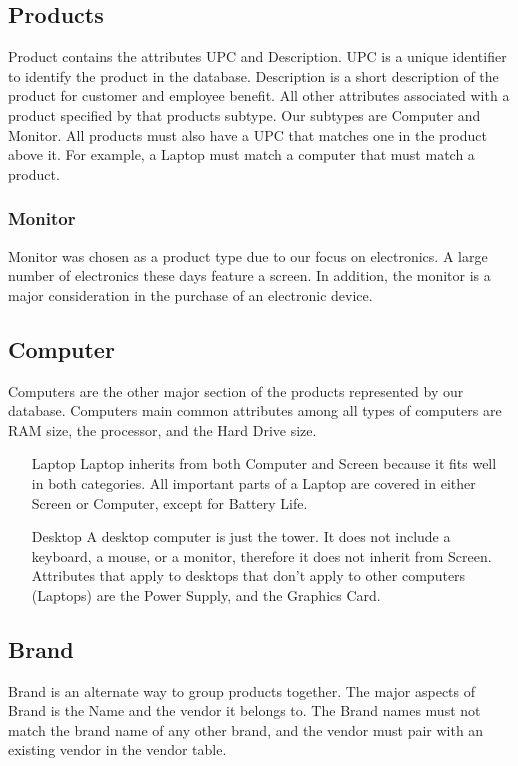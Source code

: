 \documentclass{article}
\begin{document}
		\subsection{Products}
			Product contains the attributes UPC and Description. UPC is a unique
			identifier to identify the product in the database. Description is a short
			description of the product for customer and employee benefit. All other
			attributes associated with a product specified by that products subtype.
			Our subtypes are Computer and Monitor. All products must also have a UPC that 
			matches one in the product above it. For example, a Laptop must match a 
			computer that must match a product.

			\subsubsection{Monitor}
				Monitor was chosen as a product type due to our focus on electronics.  A
				large number of electronics these days feature a screen. In addition, the
				monitor is a major consideration in the purchase of an electronic device.

			\subsection{Computer}
				Computers are the other major section of the products represented by our
				database. Computers main common attributes among all types of computers
				are RAM size, the processor, and the Hard Drive size. 
				\begin{itemize}
				
					\item [Laptop] Laptop inherits from both Computer and Screen because 
					it fits well in both categories. All important parts of a Laptop are 
					covered in either Screen or Computer, except for Battery Life.
					
					\item [Desktop]  A desktop computer is just the tower. It does not 
					include a keyboard, a mouse, or a monitor, therefore it does not 
					inherit from Screen. Attributes that apply to desktops that don't apply 
					to other computers (Laptops) are the Power Supply, and the Graphics Card.
					
				\end{itemize}

		\subsection{Brand}
			Brand is an alternate way to group products together. The major aspects of
			Brand is the Name and the vendor it belongs to. The Brand names must not 
			match the brand name of any other brand, and the vendor must pair with 
			an existing vendor in the vendor table. 
\end{document}
